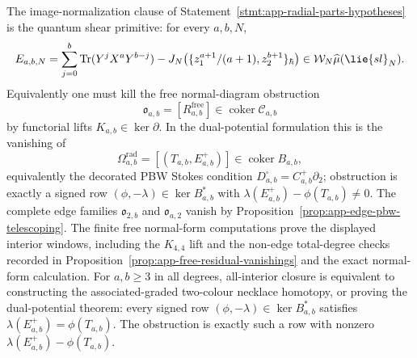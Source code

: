 \documentclass[11pt]{memoir}
\begin{document}
\begin{thm}
  The image-normalization clause of
  Statement~\ref{stmt:app-radial-parts-hypotheses} is the quantum shear
  primitive:
  for every \(a,b,N\),
  \[
    E_{a,b,N}
      =
      \sum_{j=0}^b\operatorname{Tr}(Y^jX^aY^{b-j})
      -
      J_N\!\left(
        \{z_1^{a+1}/(a+1),z_2^{b+1}\}_\hbar
      \right)
      \in \mathcal W_N\widehat\mu(\lie{sl}_N).
  \]
  Equivalently one must kill the free normal-diagram obstruction
  \[
    \mathfrak o_{a,b}
      =[R^{\mathrm{free}}_{a,b}]
      \in\operatorname{coker}\mathcal C_{a,b}
  \]
  by functorial lifts \(K_{a,b}\in\ker\partial\).  In the dual-potential
  formulation this is the vanishing of
  \[
    \Omega^{\mathrm{rad}}_{a,b}
    =
    [(T_{a,b},E^+_{a,b})]\in\operatorname{coker}B_{a,b},
  \]
  equivalently the decorated PBW Stokes condition
  \(D^\square_{a,b}=C^+_{a,b}\partial_2\); obstruction is exactly a signed
  row \((\phi,-\lambda)\in\ker B_{a,b}^*\) with
  \(\lambda(E^+_{a,b})-\phi(T_{a,b})\ne0\).  The complete edge
  families \(\mathfrak o_{2,b}\) and \(\mathfrak o_{a,2}\) vanish by
  Proposition~\ref{prop:app-edge-pbw-telescoping}.  The finite free
  normal-form computations prove the displayed interior windows, including the
  \(K_{4,4}\) lift and the non-edge total-degree checks recorded in
  Proposition~\ref{prop:app-free-residual-vanishings} and the
  exact normal-form calculation.  For \(a,b\geq3\) in all degrees,
  all-interior closure is equivalent to constructing the associated-graded
  two-colour necklace homotopy, or proving the dual-potential theorem: every signed
  row \((\phi,-\lambda)\in\ker B_{a,b}^*\) satisfies
  \(\lambda(E^+_{a,b})=\phi(T_{a,b})\).  The obstruction is exactly such a row
  with nonzero \(\lambda(E^+_{a,b})-\phi(T_{a,b})\).
\end{thm}
\end{document}
